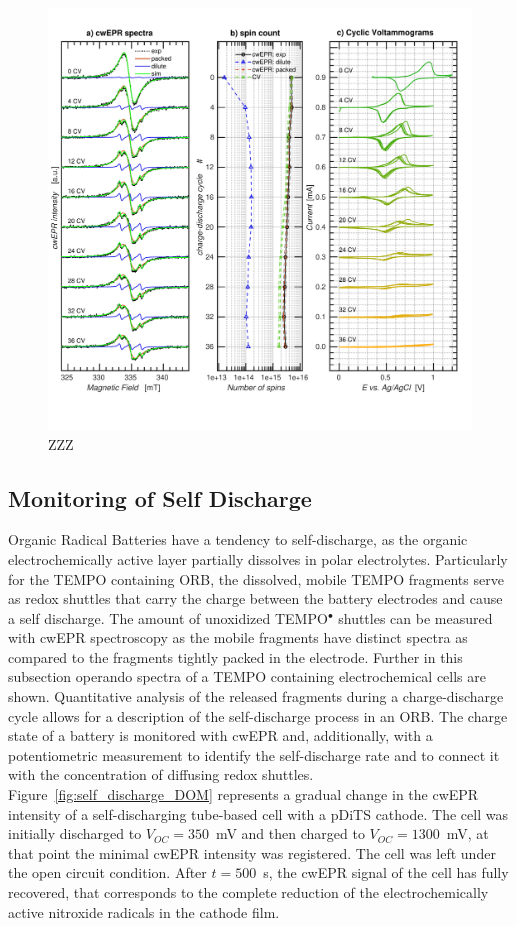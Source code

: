 \begin{figure}[!h]
\center
	\includegraphics[width=1\textwidth]{./operando_epr/figures/degradation/repeated_cycling_degradation_dits.pdf}
	\caption{ZZZ}
	\label{fig:repeated_cycling_degradation}
\end{figure}





\subsection{Monitoring of Self Discharge}
Organic Radical Batteries have a tendency to self-discharge, as the organic electrochemically active layer partially dissolves in polar electrolytes. Particularly for the TEMPO containing ORB, the dissolved, mobile TEMPO fragments serve as redox shuttles that carry the charge between the battery electrodes and cause a self discharge. The amount of unoxidized TEMPO$^\bullet$ shuttles can be measured with cwEPR spectroscopy as the mobile fragments have distinct spectra as compared to the fragments tightly packed in the electrode. Further in this subsection operando spectra of a TEMPO containing electrochemical cells are shown. Quantitative analysis of the released fragments during a charge-discharge cycle allows for a description of the self-discharge process in an ORB. The charge state of a battery is monitored with cwEPR and, additionally, with a potentiometric measurement to identify the self-discharge rate and to connect it with the concentration of diffusing redox shuttles. Figure~\ref{fig:self_discharge_DOM} represents a gradual change in the cwEPR intensity of a self-discharging tube-based cell with a pDiTS cathode. The cell was initially discharged to $V_{OC}=350$~mV and then charged to $V_{OC}=1300$~mV, at that point the minimal cwEPR intensity was registered. The cell was left under the open circuit condition. After $t=500$~s, the cwEPR signal of the cell has fully recovered, that corresponds to the complete reduction of the electrochemically active nitroxide radicals in the cathode film.

